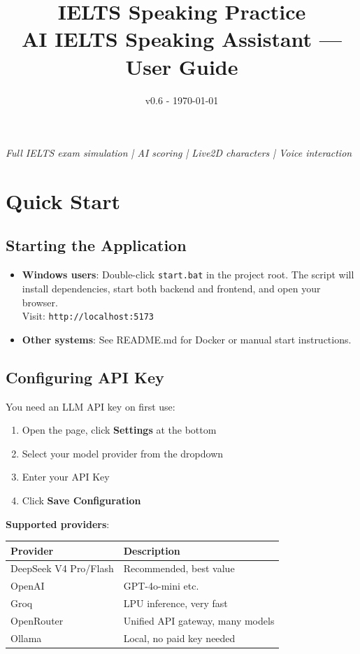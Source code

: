 \documentclass[12pt,a4paper]{article}
\title{\Large IELTS Speaking Practice\\[2pt] \normalsize AI IELTS Speaking Assistant --- User Guide}
\author{}
\date{v0.6 - \today}
\begin{document}
\maketitle
\thispagestyle{empty}
\vspace{8pt}
\begin{center}
  \textit{Full IELTS exam simulation | AI scoring | Live2D characters | Voice interaction}
\end{center}

\tableofcontents
\newpage

\section{Quick Start}

\subsection{Starting the Application}

\begin{itemize}[leftmargin=*]
  \item \textbf{Windows users}: Double-click \texttt{start.bat} in the project root. The script will install dependencies, start both backend and frontend, and open your browser.\\
    Visit: \texttt{http://localhost:5173}
  \item \textbf{Other systems}: See README.md for Docker or manual start instructions.
\end{itemize}

\subsection{Configuring API Key}

You need an LLM API key on first use:

\begin{enumerate}[leftmargin=*]
  \item Open the page, click \textbf{Settings} at the bottom
  \item Select your model provider from the dropdown
  \item Enter your API Key
  \item Click \textbf{Save Configuration}
\end{enumerate}

\textbf{Supported providers}:

\begin{tabularx}{\textwidth}{lX}
  \hline
  Provider & Description \\
  \hline
  DeepSeek V4 Pro/Flash & Recommended, best value \\
  OpenAI & GPT-4o-mini etc. \\
  Groq & LPU inference, very fast \\
  OpenRouter & Unified API gateway, many models \\
  Ollama & Local, no paid key needed \\
  \hline
\end{tabularx}
\end{document}
